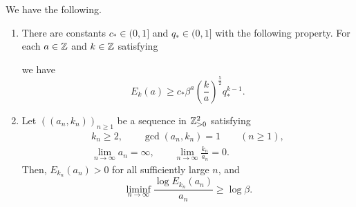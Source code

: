 \begin{theorem}\label{thm:central-lower}
We have the following.
\begin{enumerate}
\item\label{c:central-lower-finite} There are constants $c_*\in(0,1]$ and $q_*\in(0,1]$ with the following property.
For each $a\in\mathbb Z$ and $k\in\mathbb Z$ satisfying
we have
\begin{equation}\label{finite}
 E_k(a)\ge c_*\beta^a\left(\frac{k}{a}\right)^{\frac{5}{2}}q_*^{k-1}.
\end{equation}
\item\label{c:central-lower-limit} Let $((a_n,k_n))_{n\ge1}$ be a sequence in $\mathbb Z_{>0}^2$ satisfying
\[
 \begin{gathered}
 k_n\ge2,\qquad \gcd(a_n,k_n)=1\qquad(n\ge1),\\
 \lim_{n\to\infty}a_n=\infty,\qquad
 \lim_{n\to\infty}\frac{k_n}{a_n}=0.
 \end{gathered}
\]
Then, $E_{k_n}(a_n)>0$ for all sufficiently large $n$, and
\begin{equation}\label{entropy}
 \liminf_{n\to\infty}\frac{\log E_{k_n}(a_n)}{a_n}\ge\log\beta.
\end{equation}
\end{enumerate}
\end{theorem}
